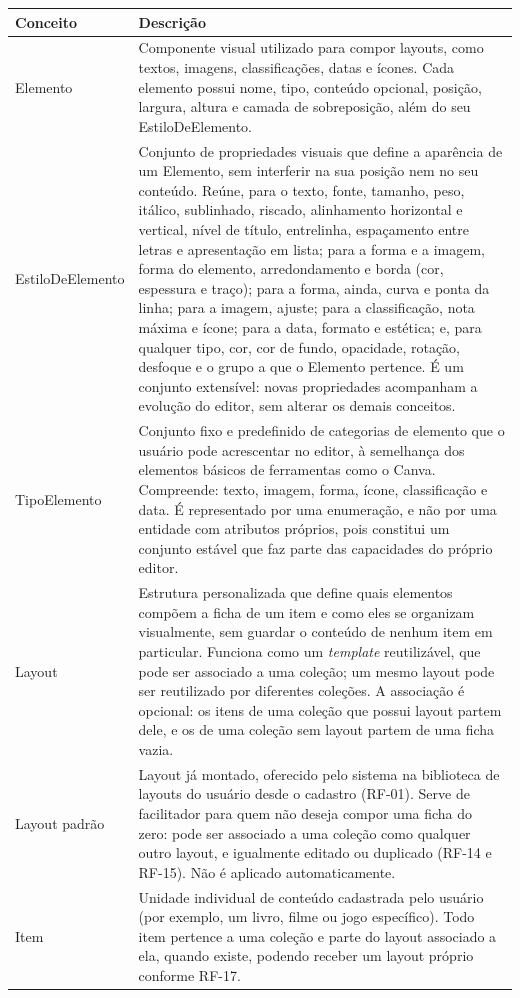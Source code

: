 \begin{quadro}[h!]
\caption{Conceitos centrais do modelo de domínio}
\label{quad:glossario_dominio}
\begin{tabular}{|p{3.5cm}|p{11.5cm}|}
\hline
\textbf{Conceito} & \textbf{Descrição} \\ \hline
Elemento & Componente visual utilizado para compor layouts, como textos, imagens, classificações, datas e ícones. Cada elemento possui nome, tipo, conteúdo opcional, posição, largura, altura e camada de sobreposição, além do seu EstiloDeElemento. \\ \hline
EstiloDeElemento & Conjunto de propriedades visuais que define a aparência de um Elemento, sem interferir na sua posição nem no seu conteúdo. Reúne, para o texto, fonte, tamanho, peso, itálico, sublinhado, riscado, alinhamento horizontal e vertical, nível de título, entrelinha, espaçamento entre letras e apresentação em lista; para a forma e a imagem, forma do elemento, arredondamento e borda (cor, espessura e traço); para a forma, ainda, curva e ponta da linha; para a imagem, ajuste; para a classificação, nota máxima e ícone; para a data, formato e estética; e, para qualquer tipo, cor, cor de fundo, opacidade, rotação, desfoque e o grupo a que o Elemento pertence. É um conjunto extensível: novas propriedades acompanham a evolução do editor, sem alterar os demais conceitos. \\ \hline
TipoElemento & Conjunto fixo e predefinido de categorias de elemento que o usuário pode acrescentar no editor, à semelhança dos elementos básicos de ferramentas como o Canva. Compreende: texto, imagem, forma, ícone, classificação e data. É representado por uma enumeração, e não por uma entidade com atributos próprios, pois constitui um conjunto estável que faz parte das capacidades do próprio editor. \\ \hline
Layout & Estrutura personalizada que define quais elementos compõem a ficha de um item e como eles se organizam visualmente, sem guardar o conteúdo de nenhum item em particular. Funciona como um \textit{template} reutilizável, que pode ser associado a uma coleção; um mesmo layout pode ser reutilizado por diferentes coleções. A associação é opcional: os itens de uma coleção que possui layout partem dele, e os de uma coleção sem layout partem de uma ficha vazia. \\ \hline
Layout padrão & Layout já montado, oferecido pelo sistema na biblioteca de layouts do usuário desde o cadastro (RF-01). Serve de facilitador para quem não deseja compor uma ficha do zero: pode ser associado a uma coleção como qualquer outro layout, e igualmente editado ou duplicado (RF-14 e RF-15). Não é aplicado automaticamente. \\ \hline
Item & Unidade individual de conteúdo cadastrada pelo usuário (por exemplo, um livro, filme ou jogo específico). Todo item pertence a uma coleção e parte do layout associado a ela, quando existe, podendo receber um layout próprio conforme RF-17. \\ \hline
\end{tabular}
\end{quadro}

